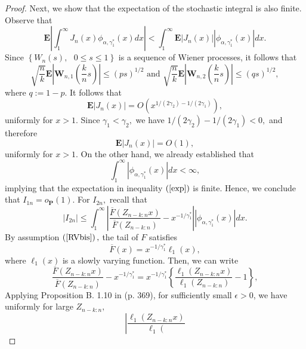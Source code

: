 \documentclass[reqno,openbib,runningheads,a4paper,12pt]{amsart}%
\begin{document}
\begin{proof}
\noindent Next, we show that the expectation of the stochastic integral is
also finite. Observe that%
\begin{equation}
\mathbf{E}\left\vert \int_{1}^{\infty}J_{n}\left(  x\right)  \phi
_{\alpha,\gamma_{1}^{\ast}}\left(  x\right)  dx\right\vert <\int_{1}^{\infty
}\mathbf{E}\left\vert J_{n}\left(  x\right)  \right\vert \left\vert
\phi_{\alpha,\gamma_{1}^{\ast}}\left(  x\right)  \right\vert dx. \label{exp}%
\end{equation}
Since $\left\{  W_{n}\left(  s\right)  ,\text{ }0\leq s\leq1\right\}  $ is a
sequence of Wiener processes, it follows that%
\[
\sqrt{\dfrac{n}{k}}\mathbf{E}\left\vert \mathbf{W}_{n,1}\left(  \dfrac{k}%
{n}s\right)  \right\vert \leq\left(  ps\right)  ^{1/2}\text{ and }\sqrt
{\dfrac{n}{k}}\mathbf{E}\left\vert \mathbf{W}_{n,2}\left(  \dfrac{k}%
{n}s\right)  \right\vert \leq\left(  qs\right)  ^{1/2},
\]
where $q:=1-p.$ It follows that
\[
\mathbf{E}\left\vert J_{n}\left(  x\right)  \right\vert =O\left(  x^{1/\left(
2\gamma_{2}\right)  -1/\left(  2\gamma_{1}\right)  }\right)  ,
\]
uniformly for $x>1.$ Since $\gamma_{1}<\gamma_{2},$ we have $1/\left(
2\gamma_{2}\right)  -1/\left(  2\gamma_{1}\right)  <0,$ and therefore
\[
\mathbf{E}\left\vert J_{n}\left(  x\right)  \right\vert =O\left(  1\right)  ,
\]
uniformly for $x>1.$ On the other hand, we already established that
\[
\int_{1}^{\infty}\left\vert \phi_{\alpha,\gamma_{1}^{\ast}}\left(  x\right)
\right\vert dx<\infty,
\]
implying that the expectation in inequality $\left(  \ref{exp}\right)  $ is
finite. Hence, we conclude that $I_{1n}=o_{\mathbf{P}}\left(  1\right)  .$ For
$I_{2n},$ recall that%
\[
\left\vert I_{2n}\right\vert \leq\int_{1}^{\infty}\left\vert \frac
{\overline{F}\left(  Z_{n-k:n}x\right)  }{\overline{F}\left(  Z_{n-k:n}%
\right)  }-x^{-1/\gamma_{1}^{\ast}}\right\vert \left\vert \phi_{\alpha
,\gamma_{1}^{\ast}}\left(  x\right)  \right\vert dx.
\]
By assumption $\left(  \ref{RVbis}\right)  ,$ the tail of $F$ satisfies
\[
\overline{F}\left(  x\right)  =x^{-1/\gamma_{1}^{\ast}}\ell_{1}\left(
x\right)  ,
\]
where $\ell_{1}\left(  x\right)  $ is a slowly varying function. Then, we can
write%
\[
\frac{\overline{F}\left(  Z_{n-k:n}x\right)  }{\overline{F}\left(
Z_{n-k:n}\right)  }-x^{-1/\gamma_{1}^{\ast}}=x^{-1/\gamma_{1}^{\ast}}\left\{
\frac{\ell_{1}\left(  Z_{n-k:n}x\right)  }{\ell_{1}\left(  Z_{n-k:n}\right)
}-1\right\}  ,
\]
Applying Proposition B. 1.10 in \cite{deHF06} (p. 369), for sufficiently small
$\epsilon>0$, we have uniformly for large $Z_{n-k:n},$
\[
\left\vert \frac{\ell_{1}\left(  Z_{n-k:n}x\right)  }{\ell_{1}\left(
}\]
\end{proof}
\end{document}
